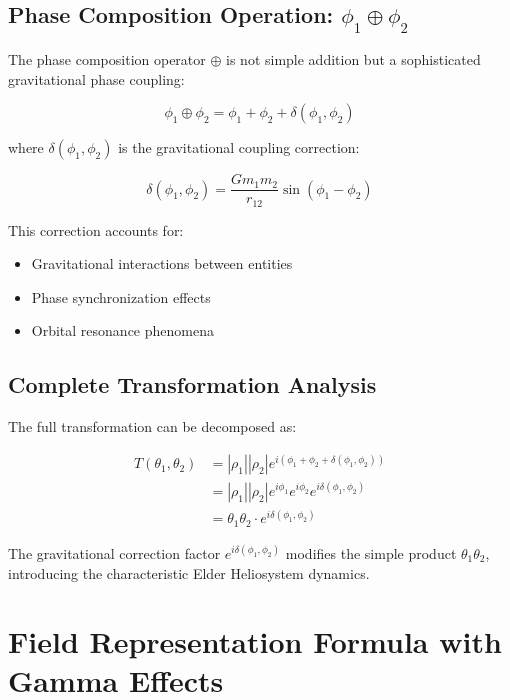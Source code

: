 \subsection{Phase Composition Operation: $\phi_1 \oplus \phi_2$}

The phase composition operator $\oplus$ is not simple addition but a sophisticated gravitational phase coupling:

\begin{equation}
\phi_1 \oplus \phi_2 = \phi_1 + \phi_2 + \delta(\phi_1, \phi_2)
\end{equation}

where $\delta(\phi_1, \phi_2)$ is the gravitational coupling correction:

\begin{equation}
\delta(\phi_1, \phi_2) = \frac{G m_1 m_2}{r_{12}} \sin(\phi_1 - \phi_2)
\end{equation}

This correction accounts for:
\begin{itemize}
    \item Gravitational interactions between entities
    \item Phase synchronization effects
    \item Orbital resonance phenomena
\end{itemize}

\subsection{Complete Transformation Analysis}

The full transformation can be decomposed as:

\begin{align}
T(\theta_1, \theta_2) &= |\rho_1||\rho_2|e^{i(\phi_1 + \phi_2 + \delta(\phi_1, \phi_2))} \\
&= |\rho_1||\rho_2|e^{i\phi_1}e^{i\phi_2}e^{i\delta(\phi_1, \phi_2)} \\
&= \theta_1 \theta_2 \cdot e^{i\delta(\phi_1, \phi_2)}
\end{align}

The gravitational correction factor $e^{i\delta(\phi_1, \phi_2)}$ modifies the simple product $\theta_1 \theta_2$, introducing the characteristic Elder Heliosystem dynamics.

\section{Field Representation Formula with Gamma Effects}

